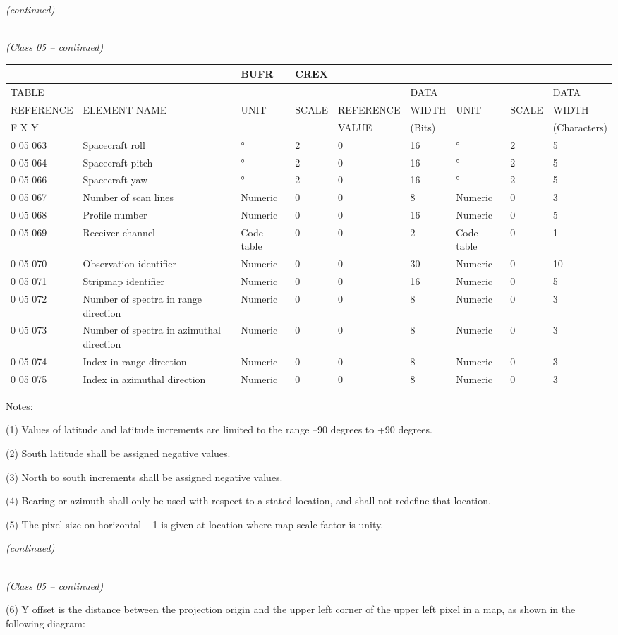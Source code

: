 \emph{(continued)}

\emph{\\
(Class 05 -- continued)}

\begin{longtable}[]{@{}lllllllll@{}}
\toprule
& & BUFR & CREX & & & & &\tabularnewline
\midrule
\endhead
TABLE & & & & & DATA & & & DATA\tabularnewline
REFERENCE & ELEMENT NAME & UNIT & SCALE & REFERENCE & WIDTH & UNIT & SCALE & WIDTH\tabularnewline
F X Y & & & & VALUE & (Bits) & & & (Characters)\tabularnewline
0 05 063 & Spacecraft roll & ° & 2 & 0 & 16 & ° & 2 & 5\tabularnewline
0 05 064 & Spacecraft pitch & ° & 2 & 0 & 16 & ° & 2 & 5\tabularnewline
0 05 066 & Spacecraft yaw & ° & 2 & 0 & 16 & ° & 2 & 5\tabularnewline
0 05 067 & Number of scan lines & Numeric & 0 & 0 & 8 & Numeric & 0 & 3\tabularnewline
0 05 068 & Profile number & Numeric & 0 & 0 & 16 & Numeric & 0 & 5\tabularnewline
0 05 069 & Receiver channel & Code table & 0 & 0 & 2 & Code table & 0 & 1\tabularnewline
0 05 070 & Observation identifier & Numeric & 0 & 0 & 30 & Numeric & 0 & 10\tabularnewline
0 05 071 & Stripmap identifier & Numeric & 0 & 0 & 16 & Numeric & 0 & 5\tabularnewline
0 05 072 & Number of spectra in range direction & Numeric & 0 & 0 & 8 & Numeric & 0 & 3\tabularnewline
0 05 073 & Number of spectra in azimuthal direction & Numeric & 0 & 0 & 8 & Numeric & 0 & 3\tabularnewline
0 05 074 & Index in range direction & Numeric & 0 & 0 & 8 & Numeric & 0 & 3\tabularnewline
0 05 075 & Index in azimuthal direction & Numeric & 0 & 0 & 8 & Numeric & 0 & 3\tabularnewline
\bottomrule
\end{longtable}

Notes:

(1) Values of latitude and latitude increments are limited to the range --90 degrees to +90 degrees.

(2) South latitude shall be assigned negative values.

(3) North to south increments shall be assigned negative values.

(4) Bearing or azimuth shall only be used with respect to a stated location, and shall not redefine that location.

(5) The pixel size on horizontal -- 1 is given at location where map scale factor is unity.

\emph{(continued)}

\emph{\\
(Class 05 -- continued)}

(6) Y offset is the distance between the projection origin and the upper left corner of the upper left pixel in a map, as shown in the following diagram:

